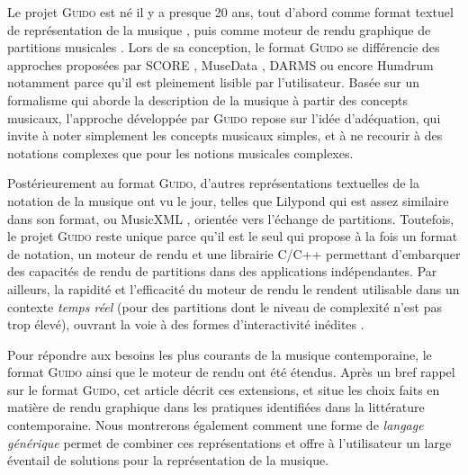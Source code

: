 \documentclass{article}
\newcommand{\guido}			{\textsc{Guido}}
\begin{document}
Le projet \guido{} est né il y a presque 20 ans, tout d'abord comme format textuel de représentation de la musique \cite{hoos98,guido}, puis comme moteur de rendu graphique de partitions musicales \cite{RENZ02}. 
Lors de sa conception, le format \guido{} se différencie des approches proposées par SCORE \cite{SCORE}, MuseData \cite{Hewlett97}, DARMS \cite{darms} ou encore Humdrum \cite{Huron97} notamment parce qu'il est pleinement lisible par l'utilisateur. Basée sur un formalisme qui aborde la description de la musique à partir des concepts musicaux, l'approche développée par \guido{} repose sur l'idée d'adéquation, qui invite à noter simplement les concepts musicaux simples, et à ne recourir à des notations complexes que pour les notions musicales complexes.

Postérieurement au format \guido{}, d'autres représentations textuelles de la notation de la musique ont vu le jour, telles que Lilypond \cite{lilypond03,lilypond06} qui est assez similaire dans son format, ou MusicXML \cite{good01}, orientée vers l'échange de partitions. Toutefois, le projet \guido{} reste unique parce qu'il est le seul qui propose à la fois un format de notation, un moteur de rendu et une librairie C/C++ permettant d'embarquer des capacités de rendu de partitions dans des applications indépendantes.
Par ailleurs, la rapidité et l'efficacité du moteur de rendu le rendent utilisable dans un contexte \textit{temps réel} (pour des partitions dont le niveau de complexité n'est pas trop élevé), ouvrant la voie à des formes d'interactivité inédites \cite{Hoadley12,Fober:12a}.

Pour répondre aux besoins les plus courants de la musique contemporaine, le format \guido{} ainsi que le moteur de rendu ont été étendus. Après un bref rappel sur le format \guido{}, cet article décrit ces extensions, et situe les choix faits en matière de rendu graphique dans les pratiques identifiées dans la littérature contemporaine. Nous montrerons également comment une forme de \emph{langage générique} permet de combiner ces représentations et offre à l'utilisateur un large éventail de solutions pour la représentation de la musique.


\end{document}
